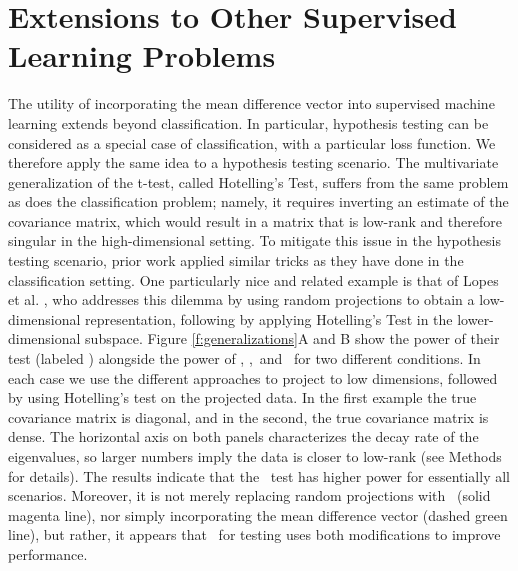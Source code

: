 \documentclass[11pt]{extarticle}
\begin{document}
\section{Extensions to Other Supervised Learning Problems}
\label{sec:other}

The utility of incorporating the mean difference vector into supervised machine learning extends beyond  classification.  In particular, hypothesis testing can be considered as a special case of classification, with a particular loss function. We therefore apply the same idea to a hypothesis testing scenario.  The multivariate generalization of the t-test, called Hotelling's Test, suffers from the same problem as does the classification problem; namely, it requires inverting an estimate of the covariance matrix, which would result in a matrix that is low-rank and therefore singular in the high-dimensional setting.
To mitigate this issue in the hypothesis testing scenario, prior work applied similar tricks as they have done in the classification setting.
One particularly nice and related example is that of  Lopes et al. \cite{Lopes2011a}, who addresses this dilemma by using random projections to obtain a low-dimensional representation, following by applying Hotelling's Test in the lower-dimensional subspace.
Figure \ref{f:generalizations}{\color{magenta}A} and {\color{magenta}B} show the power of their test (labeled ) alongside the power of \Pca, \Lol,~and \Lfl~for two different conditions.
In each case we use the different approaches to project to low dimensions, followed by using Hotelling's test on the projected data.
In the first  example the true covariance matrix is diagonal, and in the second, the true covariance matrix is dense.
The horizontal axis on both panels characterizes the decay rate of the eigenvalues, so larger numbers imply the data is closer to low-rank
(see Methods for details).  The results indicate that the \Lol~test has higher power for essentially all scenarios.  Moreover, it is not merely replacing random projections with \Pca~(solid magenta line), nor simply incorporating the mean difference vector (dashed green line), but rather, it appears that \Lol~for testing uses both modifications to improve performance.
\end{document}
